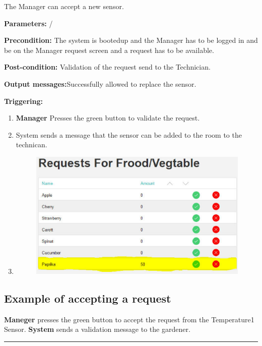 The Manager can accept a new sensor.
\begin{description}
\item \textbf{Parameters:} /
\item \textbf{Precondition:} The system is bootedup and the Manager has to be
logged in and be on the Manager request screen and a request has to be
available.
\item \textbf{Post-condition:} Validation of the request send to the Technician.
\item \textbf{Output messages:}Successfully allowed to replace the sensor.
\item \textbf{Triggering:}
\begin{enumerate}
\item \textbf{Manager} Presses the green button to validate the request.
\item System sends a message that the sensor can be added to the room to the
technican.
\item \begin{figure}[H]
\includegraphics[width=1\textwidth]{images/AcceptRequestedCropManager.eps}
\end{figure}
\end{enumerate}
\end{description}

\subsection{Example of accepting a request}
\textbf{Maneger} presses the green button to accept the request from the
Temperature1 Sensor. \textbf{System} sends a validation message to the gardener.
\hfill
\vspace{0.5cm}
\hrule

\break

